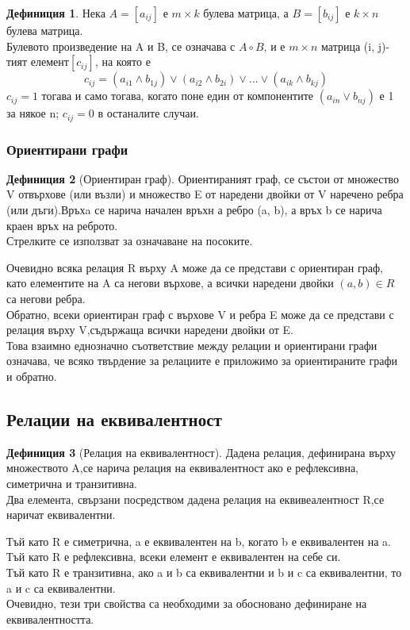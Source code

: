 \documentclass[fleqn, 12pt]{article}
\theoremstyle{definition}
\newtheorem{definition}{Дефиниция}[subsection]
\begin{document}
\begin{definition}
Нека $A = [a_{ij}]$ е $m \times k$ булева матрица, а $B = [b_{ij}]$ е $k \times n$ булева матрица.\\
Булевото произведение на A и B, се означава с $A \circ B$, и е $m\times n$ матрица (i, j)-тият елемент$[c_{ij}]$, на която е 
$$c_{ij}= (a_{i1}\land b_{1j}) \lor (a_{i2}\land b_{2i}) \lor ... \lor (a_{ik} \land b_{kj})$$
$c_{ij} = 1$ тогава и само тогава, когато поне един от компонентите $(a_{in}\lor b_{nj})$ е 1 за някое n; $c_{ij}= 0$ в останалите случаи.
\end{definition}

\subsubsection{Ориентирани графи}

\begin{definition}[Ориентиран граф]
Ориентираният граф, се състои от множество V отвърхове (или възли) и множество E от наредени двойки от V наречено ребра (или дъги).Връхa се нарича начален връхн а ребро (a, b), а връх b се нарича краен връх на реброто. \\
Стрелките се използват за означаване на посоките.
\end{definition}
Очевидно всяка релация R върху A може да се представи с ориентиран граф, като елементите на A са негови върхове, а всички наредени двойки $(a, b) \in R$ са негови ребра.\\
Обратно, всеки ориентиран граф с върхове V и ребра E може да се представи с релация върху V,съдържаща всички наредени двойки от E.\\
Това взаимно еднозначно съответствие между релации и ориентирани графи означава, че всяко твърдение за релациите е приложимо за ориентираните графи и обратно.

\subsection{Релации на еквивалентност}

\begin{definition}[Релация на еквивалентност]
Дадена релация, дефинирана върху множеството A,се нарича релация на еквивалентност ако е рефлексивна, симетрична и транзитивна. \\
Два елемента, свързани посредством дадена релация на еквивеалентност R,се наричат еквивалентни.
\end{definition}
Тъй като R е симетрична, a е еквивалентен на b, когато b е еквивалентен на a.\\
Тъй като R е рефлексивна, всеки елемент е еквивалентен на себе си.\\
Тъй като R е транзитивна, ако a и b са еквивалентни и b и c са еквивалентни, то a и c са еквивалентни.\\
Очевидно, тези три свойства са необходими за обосновано дефиниране на еквивалентността.
\end{document}
